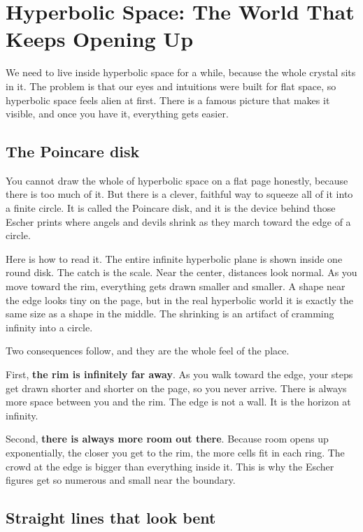 \section{Hyperbolic Space: The World That Keeps Opening Up}

We need to live inside hyperbolic space for a while, because the whole crystal sits in it. The problem is that our eyes and intuitions were built for flat space, so hyperbolic space feels alien at first. There is a famous picture that makes it visible, and once you have it, everything gets easier.

\subsection{The Poincare disk}

You cannot draw the whole of hyperbolic space on a flat page honestly, because there is too much of it. But there is a clever, faithful way to squeeze all of it into a finite circle. It is called the Poincare disk, and it is the device behind those Escher prints where angels and devils shrink as they march toward the edge of a circle.

Here is how to read it. The entire infinite hyperbolic plane is shown inside one round disk. The catch is the scale. Near the center, distances look normal. As you move toward the rim, everything gets drawn smaller and smaller. A shape near the edge looks tiny on the page, but in the real hyperbolic world it is exactly the same size as a shape in the middle. The shrinking is an artifact of cramming infinity into a circle.

Two consequences follow, and they are the whole feel of the place.

First, \textbf{the rim is infinitely far away}. As you walk toward the edge, your steps get drawn shorter and shorter on the page, so you never arrive. There is always more space between you and the rim. The edge is not a wall. It is the horizon at infinity.

Second, \textbf{there is always more room out there}. Because room opens up exponentially, the closer you get to the rim, the more cells fit in each ring. The crowd at the edge is bigger than everything inside it. This is why the Escher figures get so numerous and small near the boundary.

\subsection{Straight lines that look bent}

